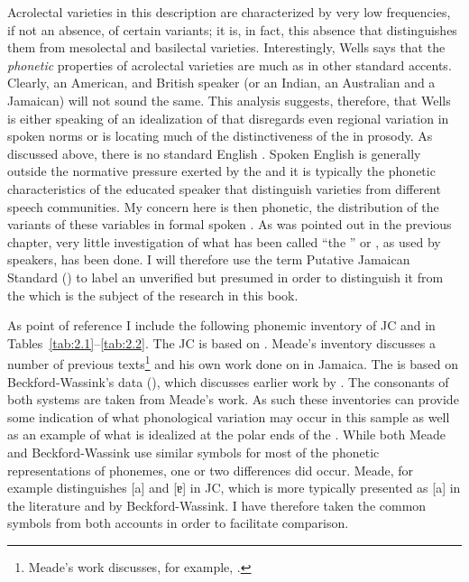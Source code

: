 Acrolectal varieties in this description are characterized by very low frequencies, if not an absence, of certain variants; it is, in fact, this absence that distinguishes them from mesolectal and basilectal varieties.  Interestingly, Wells says that the \textit{phonetic} properties of acrolectal varieties are much as in other standard accents.  Clearly, an American,  and British speaker (or an Indian, an Australian and a Jamaican) will not sound the same.  This analysis suggests, therefore, that Wells is either speaking of an idealization of  that disregards even regional variation in spoken norms or is locating much of the distinctiveness of the  in prosody.  As discussed above, there is no standard English .  Spoken English is generally outside the normative pressure exerted by the  and it is typically the phonetic characteristics of the educated speaker that distinguish varieties from different speech communities.  My concern here is then phonetic, the distribution of the variants of these variables in formal spoken .  As was pointed out in the previous chapter, very little investigation of what has been called “the ” or , as used by speakers, has been done.  I will therefore use the term Putative Jamaican Standard () to label an unverified but presumed  in order to distinguish it from the  which is the subject of the research in this book. 

As point of reference I include the following phonemic inventory of JC and  in Tables~\ref{tab:2.1}--\ref{tab:2.2}.  The JC  is based on \citet[35--42]{Meade2001}.  Meade’s inventory discusses a number of previous texts\footnote{Meade’s work discusses, for example, \citet{Akers1981,Alleyne1980a,Cassidy1967,Beckford-Wassink1999a,DevonishSeiler1991}.}  and his own work done on  in Jamaica.  The   is based on Beckford-Wassink’s data (\citeyear[150--151]{BeckfordWassink2001}), which discusses earlier work by \citet{Wells1973}.  The consonants of both systems are taken from Meade’s work.  As such these inventories can provide some indication of what phonological variation may occur in this  sample as well as an example of what is idealized at the polar ends of the .  While both Meade and Beckford-Wassink use similar symbols for most of the phonetic representations of pho\-nemes, one or two differences did occur.  Meade, for example distinguishes [a] and [ɐ] in JC, which is more typically presented as [a] in the literature and by Beckford-Wassink.  I have therefore taken the common symbols from both accounts in order to facilitate comparison.  


